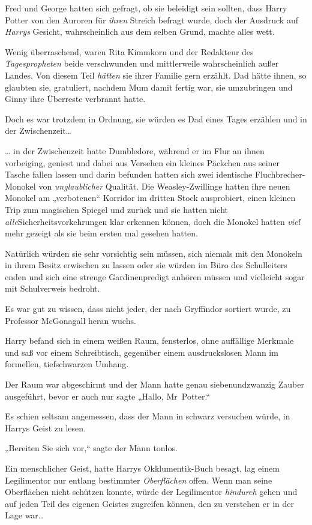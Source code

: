 {Fred und George hatten sich gefragt, ob sie beleidigt sein sollten, dass Harry Potter von den Auroren für \emph{ihren} Streich befragt wurde, doch der Ausdruck auf \emph{Harrys} Gesicht, wahrscheinlich aus dem selben Grund, machte alles wett.

Wenig überraschend, waren Rita Kimmkorn und der Redakteur des \emph{Tagespropheten} beide verschwunden und mittlerweile wahrscheinlich außer Landes. Von diesem Teil \emph{hätten} sie ihrer Familie gern erzählt. Dad hätte ihnen, so glaubten sie, gratuliert, nachdem Mum damit fertig war, sie umzubringen und Ginny ihre Überreste verbrannt hatte.

Doch es war trotzdem in Ordnung, sie würden es Dad eines Tages erzählen und in der Zwischenzeit…

… in der Zwischenzeit hatte Dumbledore, während er im Flur an ihnen vorbeiging, geniest und dabei aus Versehen ein kleines Päckchen aus seiner Tasche fallen lassen und darin befunden hatten sich zwei identische Fluchbrecher-Monokel von \emph{unglaublicher} Qualität. Die Weasley-Zwillinge hatten ihre neuen Monokel am „verbotenen“ Korridor im dritten Stock ausprobiert, einen kleinen Trip zum magischen Spiegel und zurück und sie hatten nicht \emph{alle}Sicherheitsvorkehrungen klar erkennen können, doch die Monokel hatten \emph{viel} mehr gezeigt als sie beim ersten mal gesehen hatten.

Natürlich würden sie sehr vorsichtig sein müssen, sich niemals mit den Monokeln in ihrem Besitz erwischen zu lassen oder sie würden im Büro des Schulleiters enden und sich eine strenge Gardinenpredigt anhören müssen und vielleicht sogar mit Schulverweis bedroht.

Es war gut zu wissen, dass nicht jeder, der nach Gryffindor sortiert wurde, zu Professor McGonagall heran wuchs.

\later

Harry befand sich in einem weißen Raum, fensterlos, ohne auffällige Merkmale und saß vor einem Schreibtisch, gegenüber einem ausdruckslosen Mann im formellen, tiefschwarzen Umhang.

Der Raum war abgeschirmt und der Mann hatte genau siebenundzwanzig Zauber ausgeführt, bevor er auch nur sagte „Hallo, Mr~Potter.“

Es schien seltsam angemessen, dass der Mann in schwarz versuchen würde, in Harrys Geist zu lesen.

„Bereiten Sie sich vor,“ sagte der Mann tonlos.

Ein menschlicher Geist, hatte Harrys Okklumentik-Buch besagt, lag einem Legilimentor nur entlang bestimmter \emph{Oberflächen} offen. Wenn man seine Oberflächen nicht schützen konnte, würde der Legilimentor \emph{hindurch} gehen und auf jeden Teil des eigenen Geistes zugreifen können, den zu verstehen er in der Lage war…

}
